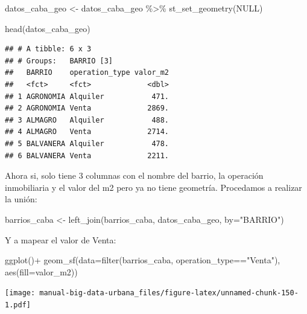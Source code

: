 \documentclass[
  spanish,
]{book}
\newenvironment{Shaded}{\begin{snugshade}}{\end{snugshade}}
\newcommand{\AttributeTok}[1]{\textcolor[rgb]{0.77,0.63,0.00}{#1}}
\newcommand{\ConstantTok}[1]{\textcolor[rgb]{0.00,0.00,0.00}{#1}}
\newcommand{\FunctionTok}[1]{\textcolor[rgb]{0.00,0.00,0.00}{#1}}
\newcommand{\NormalTok}[1]{#1}
\newcommand{\OtherTok}[1]{\textcolor[rgb]{0.56,0.35,0.01}{#1}}
\newcommand{\SpecialCharTok}[1]{\textcolor[rgb]{0.00,0.00,0.00}{#1}}
\newcommand{\StringTok}[1]{\textcolor[rgb]{0.31,0.60,0.02}{#1}}
\begin{document}
\begin{Shaded}
\begin{Highlighting}[]
\NormalTok{datos\_caba\_geo }\OtherTok{\textless{}{-}}\NormalTok{ datos\_caba\_geo }\SpecialCharTok{\%\textgreater{}\%}
  \FunctionTok{st\_set\_geometry}\NormalTok{(}\ConstantTok{NULL}\NormalTok{)}
\end{Highlighting}
\end{Shaded}

\begin{Shaded}
\begin{Highlighting}[]
\FunctionTok{head}\NormalTok{(datos\_caba\_geo)}
\end{Highlighting}
\end{Shaded}

\begin{verbatim}
## # A tibble: 6 x 3
## # Groups:   BARRIO [3]
##   BARRIO    operation_type valor_m2
##   <fct>     <fct>             <dbl>
## 1 AGRONOMIA Alquiler           471.
## 2 AGRONOMIA Venta             2869.
## 3 ALMAGRO   Alquiler           488.
## 4 ALMAGRO   Venta             2714.
## 5 BALVANERA Alquiler           478.
## 6 BALVANERA Venta             2211.
\end{verbatim}

Ahora si, solo tiene 3 columnas con el nombre del barrio, la operación inmobiliaria y el valor del m2 pero ya no tiene geometría. Procedamos a realizar la unión:

\begin{Shaded}
\begin{Highlighting}[]
\NormalTok{barrios\_caba }\OtherTok{\textless{}{-}} \FunctionTok{left\_join}\NormalTok{(barrios\_caba, datos\_caba\_geo, }\AttributeTok{by=}\StringTok{"BARRIO"}\NormalTok{)}
\end{Highlighting}
\end{Shaded}

Y a mapear el valor de Venta:

\begin{Shaded}
\begin{Highlighting}[]
\FunctionTok{ggplot}\NormalTok{()}\SpecialCharTok{+}
  \FunctionTok{geom\_sf}\NormalTok{(}\AttributeTok{data=}\FunctionTok{filter}\NormalTok{(barrios\_caba, operation\_type}\SpecialCharTok{==}\StringTok{"Venta"}\NormalTok{), }\FunctionTok{aes}\NormalTok{(}\AttributeTok{fill=}\NormalTok{valor\_m2))}
\end{Highlighting}
\end{Shaded}

\texttt{[image: manual-big-data-urbana\_files/figure-latex/unnamed-chunk-150-1.pdf]}
\end{document}
